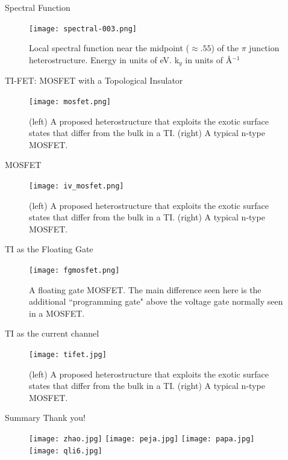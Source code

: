 \documentclass[]{beamer}
\begin{document}
\begin{frame}{Spectral Function}
\begin{figure}
\center
\texttt{[image: spectral-003.png]}
\caption{Local spectral function near the midpoint ($\approx .55$) of the $\pi$ junction heterostructure.  Energy in units of eV. k$_y$ in units of \AA$^{-1}$
}\label{spectral-jj}
\end{figure}


\end{frame}  



\begin{frame}{TI-FET: MOSFET with a Topological Insulator}
\begin{figure}[h]
\center
\texttt{[image: mosfet.png]}
\caption{(left) A proposed heterostructure that exploits the exotic surface states that differ from the bulk in a TI. (right) A typical n-type MOSFET.
}\label{mosfet}
\end{figure}
\end{frame}  

\begin{frame}{MOSFET}


\begin{figure}[h]
\center
\texttt{[image: iv\_mosfet.png]}
\caption{(left) A proposed heterostructure that exploits the exotic surface states that differ from the bulk in a TI. (right) A typical n-type MOSFET.
}\label{ivmosfet}
\end{figure}

\clearpage
\end{frame}  

\begin{frame}{TI as the Floating Gate}

\begin{figure}[h]
\center
\texttt{[image: fgmosfet.png]}
\caption{A floating gate MOSFET. The main difference seen here is the additional ``programming gate" above the voltage gate normally seen in a MOSFET.
}\label{fgmosfet}
\end{figure}

\clearpage
\end{frame}  

\begin{frame}{TI as the current channel}

\begin{figure}[h]
\center
\texttt{[image: tifet.jpg]}
\caption{(left) A proposed heterostructure that exploits the exotic surface states that differ from the bulk in a TI. (right) A typical n-type MOSFET.
}\label{tifet}
\end{figure}

\end{frame}  


\begin{frame}{Summary}
\center \Large Thank you!

\begin{figure}[h]
\center
\texttt{[image: zhao.jpg]}
\texttt{[image: peja.jpg]}
\texttt{[image: papa.jpg]}
\texttt{[image: qli6.jpg]}
\end{figure}
\end{frame}  


%
\end{document}
